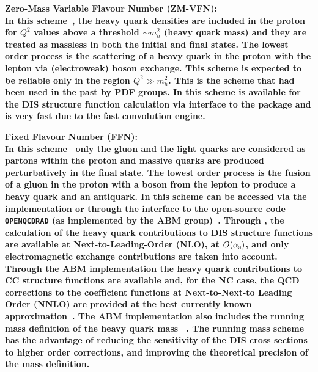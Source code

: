 \begin{description}
\item \bf{Zero-Mass Variable Flavour Number (ZM-VFN):}\rm 
\\
In this scheme~\cite{ZMVFNpub}, the
heavy quark densities are included in the proton for $Q^2$ values above a threshold $\sim m_h^2$ (heavy quark mass)
and they 
are treated as massless in both the initial 
and final states. The lowest order process is the scattering
of a heavy quark in the proton with the lepton via (electroweak) boson exchange.
This scheme is expected to be reliable only in the region $Q^2 \gg m_h^2$.
This is the scheme that had been used in the past by PDF groups.
In \fitter this scheme is available for the DIS structure function calculation 
via interface to the \qcdnum \cite{qcdnum} package and is very fast 
due to the fast \qcdnum convolution engine.

\item \bf {Fixed Flavour Number (FFN):} \rm 
\\
In this scheme~\cite{Laenen:1992, Laenen:1993, Riem:1995}
 only the gluon and the light quarks are considered
as partons within the proton and massive 
quarks are produced perturbatively in the final state.
The lowest order process is the fusion of a gluon in the proton
with a boson from the lepton to produce a heavy quark and an antiquark.
In \fitter this scheme can be accessed via the 
\qcdnum implementation or through the interface to the open-source code \texttt{OPENQCDRAD} (as implemented by the ABM group)~\cite{openqcdrad:page}.
Through \qcdnum, the calculation of the heavy quark contributions to DIS structure functions
are available at Next-to-Leading-Order (NLO), at $O(\alpha_\mathrm{s})$, and only electromagnetic exchange contributions are taken into account.
Through the ABM implementation the heavy quark contributions to CC structure functions are available 
and, for the NC case, the QCD corrections to the coefficient functions at Next-to-Next-to Leading Order (NNLO)
are provided at the best currently known approximation~\cite{SMoch:npb864}.
The ABM implementation also includes the running mass definition of the heavy quark 
mass ~\cite{Alekhin:runm}.
The running mass scheme has the advantage of reducing the sensitivity of the DIS cross sections to
higher order corrections, and improving the theoretical precision of the mass definition. 



\end{description}
